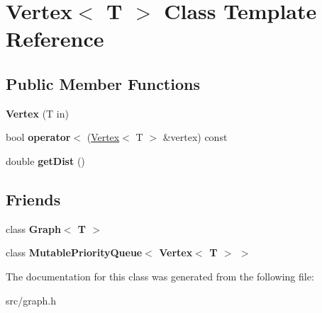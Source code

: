 \hypertarget{class_vertex}{}\section{Vertex$<$ T $>$ Class Template Reference}
\label{class_vertex}
\subsection*{Public Member Functions}
\begin{DoxyCompactItemize}
\item 
\mbox{\label{class_vertex_afcbdd4d4198b672356559cb8fa088408}} 
{\bfseries Vertex} (T in)
\item 
\mbox{\label{class_vertex_a5a6670b842354232bac4dad2f551d66e}} 
bool {\bfseries operator$<$} (\mbox{\hyperlink{class_vertex}{Vertex}}$<$ T $>$ \&vertex) const
\item 
\mbox{\label{class_vertex_a2d06d0997dd56735bad8baa45f45d3a0}} 
double {\bfseries get\+Dist} ()
\end{DoxyCompactItemize}
\subsection*{Friends}
\begin{DoxyCompactItemize}
\item 
\mbox{\label{class_vertex_aefa9b76cd57411c5354e5620dc2d84dd}} 
class {\bfseries Graph$<$ T $>$}
\item 
\mbox{\label{class_vertex_ae53e0b4fec14b9f1eaa8a4f8cd426e9e}} 
class {\bfseries Mutable\+Priority\+Queue$<$ Vertex$<$ T $>$ $>$}
\end{DoxyCompactItemize}


The documentation for this class was generated from the following file\+:\begin{DoxyCompactItemize}
\item 
src/graph.\+h\end{DoxyCompactItemize}
